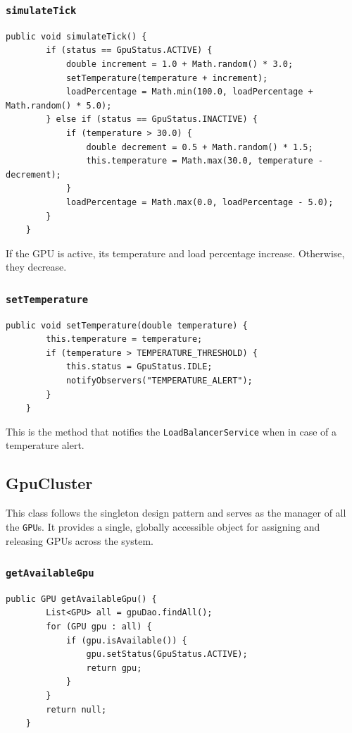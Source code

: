 \documentclass[a4paper,11pt]{report}
\begin{document}
	\subsubsection{\texttt{simulateTick}}
	\begin{lstlisting}[label={lst:gpusimulate}]
	public void simulateTick() {
		if (status == GpuStatus.ACTIVE) {
			double increment = 1.0 + Math.random() * 3.0;
			setTemperature(temperature + increment);
			loadPercentage = Math.min(100.0, loadPercentage + Math.random() * 5.0);
		} else if (status == GpuStatus.INACTIVE) {
			if (temperature > 30.0) {
				double decrement = 0.5 + Math.random() * 1.5;
				this.temperature = Math.max(30.0, temperature - decrement);
			}
			loadPercentage = Math.max(0.0, loadPercentage - 5.0);
		}
	}
	\end{lstlisting}
	If the GPU is active, its temperature and load percentage increase. Otherwise, they decrease.

	\subsubsection{\texttt{setTemperature}}
	\begin{lstlisting}[label={lst:gputemperature}]
	public void setTemperature(double temperature) {
		this.temperature = temperature;
		if (temperature > TEMPERATURE_THRESHOLD) {
			this.status = GpuStatus.IDLE;
			notifyObservers("TEMPERATURE_ALERT");
		}
	}
	\end{lstlisting}
	This is the method that notifies the \texttt{LoadBalancerService} when in case of a temperature alert.

	\subsection{GpuCluster}
	This class follows the singleton design pattern and serves as the manager of all the \texttt{GPU}s. It provides a single, globally accessible object for assigning and releasing GPUs across the system.
	\subsubsection{\texttt{getAvailableGpu}}
	\begin{lstlisting}[label={lst:gpuclustergetavailable}]
	public GPU getAvailableGpu() {
	    List<GPU> all = gpuDao.findAll();
	    for (GPU gpu : all) {
	        if (gpu.isAvailable()) {
	            gpu.setStatus(GpuStatus.ACTIVE);
	            return gpu;
	        }
	    }
	    return null;
	}
	\end{lstlisting}
	
\end{document}
